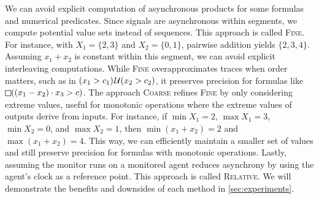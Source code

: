 We can avoid explicit computation of asynchronous products for some formulas and numerical predicates.
Since signals are asynchronous within segments, we compute potential value sets instead of sequences.
\alert{This approach is called \textsc{Fine}.}
For instance, with $X_1 = \{2,3\}$ and $X_2 = \{0,1\}$, pairwise addition yields $\{2, 3, 4\}$.
Assuming $x_1 + x_2$ is constant within this segment, we can avoid explicit interleaving computations.
While \textsc{Fine} overapproximates traces when order matters, such as in $(x_1 > c_1) \kern.1em\mathcal{U} (x_2 > c_2)$, it preserves precision for formulas like $\LTLalways((x_1 - x_2) \cdot x_3 > c)$.
The approach \textsc{Coarse} refines \textsc{Fine} by only considering extreme values, useful for monotonic operations where the extreme values of outputs derive from inputs.
For instance, if $\min X_1 = 2$, $\max X_1 = 3$, $\min X_2 = 0$, and $\max X_2 = 1$, then $\min(x_1 + x_2) = 2$ and $\max(x_1 + x_2) = 4$.
This way, we can efficiently maintain a smaller set of values and still preserve precision for formulas with monotonic operations.
Lastly, assuming the monitor runs on a monitored agent reduces asynchrony by using the agent's clock as a reference point.
\alert{This approach is called \textsc{Relative}.}
We will demonstrate the benefits and downsides of each method in \cref{sec:experiments}.

